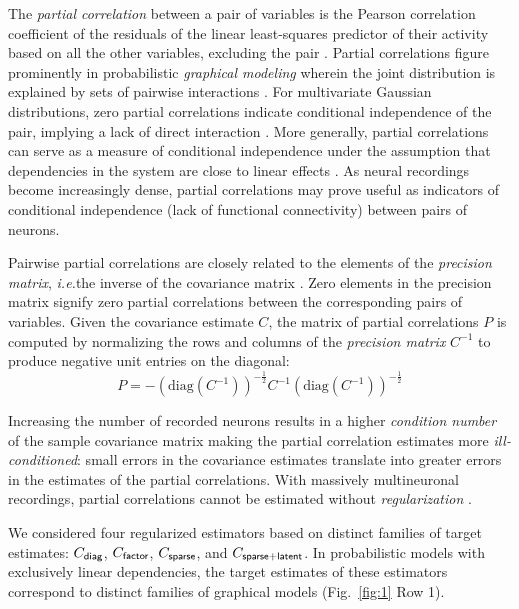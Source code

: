 The \emph{partial correlation} between a pair of variables is the Pearson correlation coefficient of the residuals of the linear least-squares predictor of their activity based on all the other variables, excluding the pair \cite{Anderson:2003, Whittaker:1990}. Partial correlations figure prominently in probabilistic \emph{graphical modeling} wherein the joint distribution is explained by sets of pairwise interactions \cite{Whittaker:1990}. For multivariate Gaussian distributions, zero partial correlations indicate conditional independence of the pair, implying a lack of direct interaction \cite{Dempster:1972, Whittaker:1990}. More generally, partial correlations can serve as a measure of conditional independence under the assumption that dependencies in the system are close to linear effects \cite{Whittaker:1990,Baba:2004}. As neural recordings become increasingly dense, partial correlations may prove useful as indicators of conditional independence (lack of functional connectivity) between pairs of neurons.

Pairwise partial correlations are closely related to the elements of the \emph{precision matrix}, \emph{i.e.}\;the inverse of the covariance matrix \cite{Dempster:1972,Whittaker:1990}. Zero elements in the precision matrix signify zero partial correlations between the corresponding pairs of variables. Given the covariance estimate $C$, the matrix of partial correlations $P$ is computed by normalizing the rows and columns of the \emph{precision matrix} $C^{-1}$ to produce negative unit entries on the diagonal:
\begin{equation}\label{eq:partial}
    P = -\left(\mbox{diag}(C^{-1})\right)^{-\frac 1 2} C^{-1} \left(\mbox{diag}(C^{-1})\right)^{-\frac 1 2}
\end{equation}

Increasing the number of recorded neurons results in a higher \emph{condition number} of the sample covariance matrix \cite{Ledoit:2004} making the partial correlation estimates more \emph{ill-conditioned}: small errors in the covariance estimates translate into greater errors in the estimates of the partial correlations. With massively multineuronal recordings, partial correlations cannot be estimated without \emph{regularization} \cite{Ledoit:2004,Schafer:2005}.

We considered four regularized estimators based on distinct families of target estimates: $C_{\sf diag}$, $C_{\sf factor}$, $C_{\sf sparse}$, and $C_{\sf sparse+latent}$. In probabilistic models with exclusively linear dependencies, the target estimates of these estimators correspond to distinct families of graphical models (Fig.~\ref{fig:1} Row 1). 

